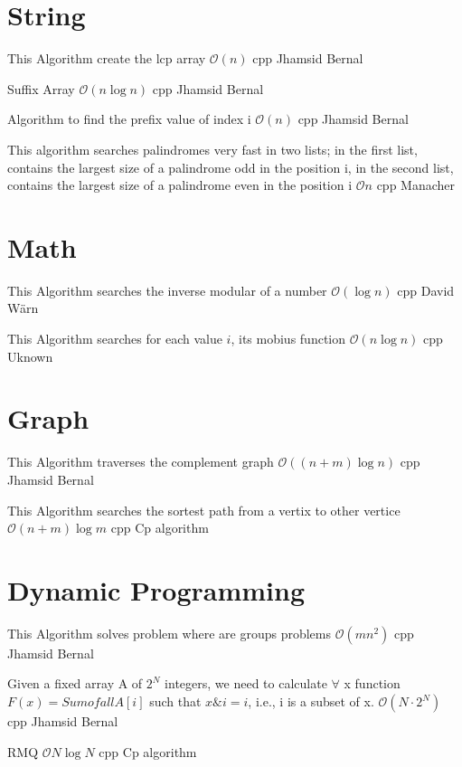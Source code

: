 \section{String}

{This Algorithm create the lcp array}
{$\mathcal{O}(n)$}
{cpp}{}
{Jhamsid Bernal}

{Suffix Array}
{$\mathcal{O}(n \log{n})$}
{cpp}{}
{Jhamsid Bernal}
\progress

{Algorithm to find the prefix value of index i}
{$\mathcal{O}(n)$}
{cpp}{}
{Jhamsid Bernal}
\progress

{This algorithm searches palindromes very fast in two lists; in the first list, contains the largest size of a palindrome odd in the position i, in the second list, contains the largest size of a palindrome even in the position i}
{$\mathcal{O}{n}$}
{cpp}{}
{Manacher}
\section{Math}

{This Algorithm searches the inverse modular of a number}
{$\mathcal{O}(\log{n})$}
{cpp}{}
{David Wärn}

{This Algorithm searches for each value $i$, its mobius function}
{$\mathcal{O}(n\log{n})$}
{cpp}{}
{Uknown}

\section{Graph}

{This Algorithm traverses the complement graph}
{$\mathcal{O}((n + m)\log{n})$}
{cpp}{}
{Jhamsid Bernal}
\progress

{This Algorithm searches the sortest path from a vertix to other vertice}
{$\mathcal{O}(n + m)\log{m}$}
{cpp}{}
{Cp algorithm}

\section{Dynamic Programming}

{This Algorithm solves problem where are groups problems}
{$\mathcal{O}(mn^2)$}
{cpp}{}
{Jhamsid Bernal}
\progress

{Given a fixed array A of $2^N$ integers, we need to calculate $\forall$
x function $F(x) = Sum of all A[i]$ such that $x\&i = i$, i.e., i is a subset 
of x.}
{$\mathcal{O}(N \cdot 2^N)$}
{cpp}{}
{Jhamsid Bernal}

{RMQ}
{$\mathcal{O}{N \log{N}}$}
{cpp}{}
{Cp algorithm}
